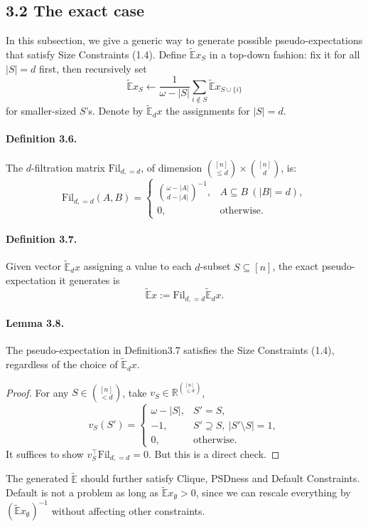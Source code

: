 \documentclass[10pt,a4paper]{article}
\begin{document}
\subsection*{3.2 The exact case}
In this subsection, we give a generic way to generate possible pseudo-expectations that satisfy Size Constraints (1.4). Define $\widetilde{\mathbb E}x_S$ in a top-down fashion: fix it for all $|S|=d$ first, then recursively set
\[\widetilde{\mathbb E}x_S\leftarrow\frac1{\omega-|S|}\sum_{i\notin S}\widetilde{\mathbb E}x_{S\cup\{i\}}\tag{3.13}\]
for smaller-sized $S$'s. Denote by $\widetilde{\mathbb E}_dx$ the assignments for $|S|=d$.
\paragraph{Definition 3.6.} The $d$-filtration matrix $\mathrm{Fil}_{d,=d}$, of dimension $\binom{[n]}{\le d}\times\binom{[n]}d$, is:
\[\mathrm{Fil}_{d,=d}(A,B)=\begin{cases}\binom{\omega-|A|}{d-|A|}^{-1},&A\subseteq B\ (|B|=d),\\0,&\text{otherwise}.\end{cases}\tag{3.14}\]
\paragraph{Definition 3.7.} Given vector $\widetilde{\mathbb E}_dx$ assigning a value to each $d$-subset $S\subseteq[n]$, the exact pseudo-expectation it generates is
\[\widetilde{\mathbb E}x:=\mathrm{Fil}_{d,=d}\widetilde{\mathbb E}_dx.\tag{3.15}\]
\paragraph{Lemma 3.8.} The pseudo-expectation in Definition3.7 satisfies the Size Constraints (1.4), regardless of the choice of $\widetilde{\mathbb E}_dx$.
\begin{proof}For any $S\in\binom{[n]}{<d}$, take $v_S\in\mathbb R^{\binom{[n]}{\le d}}$,
\[v_S(S')=\begin{cases}\omega-|S|,&S'=S,\\-1,&S'\supseteq S,\ |S'\setminus S|=1,\\0,&\text{otherwise}.
\end{cases}\]
It suffices to show $v_S^\top\mathrm{Fil}_{d,=d}=0$. But this is a direct check.\end{proof}
The generated $\widetilde{\mathbb E}$ should further satisfy Clique, PSDness and Default Constraints. Default is not a problem as long as $\widetilde{\mathbb E}x_\emptyset>0$, since we can rescale everything by $(\widetilde{\mathbb E}x_\emptyset)^{-1}$ without affecting other constraints.
\end{document}
